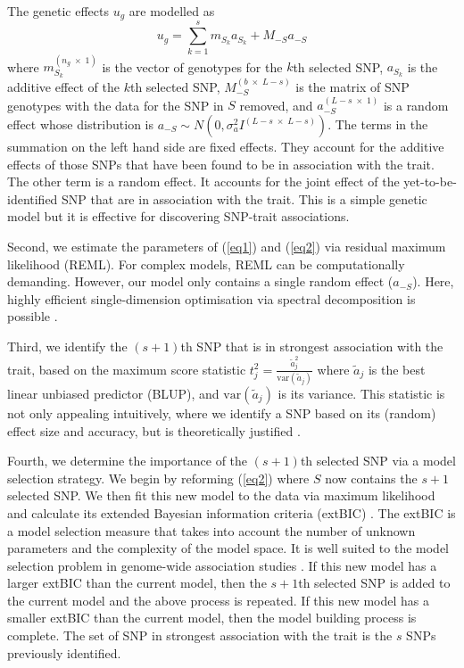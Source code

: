 \documentclass{article}
\begin{document}
The genetic effects $u_g$ are modelled as 
\begin{equation}
\label{eq2}
u_g = \sum_{k=1}^s  m_{S_k} a_{S_k} + M_{-S} a_{-S}
\end{equation}
where $m_{S_k}^{(n_g \; \times \; 1)}$ is the vector of genotypes for the  $k$th selected SNP, 
$a_{S_k}$ is the additive effect of the $k$th selected SNP, $M_{-S}^{(b \; \times \; L-s)}$ is the matrix of  SNP genotypes 
with the data for the SNP in $S$ removed,  and $a_{-S}^{(L-s \; \times  \; 1)}$ is a random effect whose distribution is 
$a_{-S} \sim N(0, \sigma_a^2 I^{(L-s \; \times \;  L-s)})$. 
The terms in the summation on the left hand side are fixed effects.   They account 
for the additive effects of those SNPs that have been found to be in association with the trait. The other term is a random effect. 
It accounts for the joint effect of the yet-to-be-identified SNP that are in association with the trait. 
This is a simple genetic model but it 
is effective for discovering SNP-trait associations. 


Second, we estimate the parameters of (\ref{eq1}) and (\ref{eq2}) via residual maximum likelihood (REML).  For complex models, REML
can be computationally demanding. However, our model only contains a single random effect ($a_{-S}$). Here, highly efficient single-dimension 
optimisation via spectral decomposition is possible \cite{kang2008efficient}. 

Third, we identify the $(s+1)$th SNP that is in strongest association with the trait, based on the maximum score statistic
$t_j^2 = \frac{ \widetilde{a} _j^2}{\textrm{var}(\widetilde{a}_j)}$ where $\widetilde{a}_j$ is the best linear unbiased predictor (BLUP), 
and $\textrm{var}(\widetilde{a}_j)$ is its variance. This statistic is not only appealing intuitively, where we 
identify a SNP based on its (random) effect size and accuracy, but is theoretically justified \cite{verbyla2012rwgaim}.

Fourth, we determine the importance of the $(s+1)$th selected SNP via a model selection strategy. 
We begin by reforming (\ref{eq2}) where $S$ now contains the $s + 1$ selected SNP.  We then fit this new model to the data
via maximum likelihood and calculate its extended Bayesian information criteria (extBIC) \cite{chen2008extended}.  The 
extBIC is a model selection measure that takes into account the number of unknown parameters and the complexity 
of the model space.  It is well suited to the model selection problem in genome-wide association studies \cite{chen2008extended}. If this new model has a larger extBIC than the current model, then the $s+1$th selected SNP is added to 
the current model and the above process is repeated. If this new model has a smaller extBIC than the current model, then the 
model building process is complete. The set of SNP in strongest association with the trait is the $s$ SNPs previously identified. 
\end{document}

